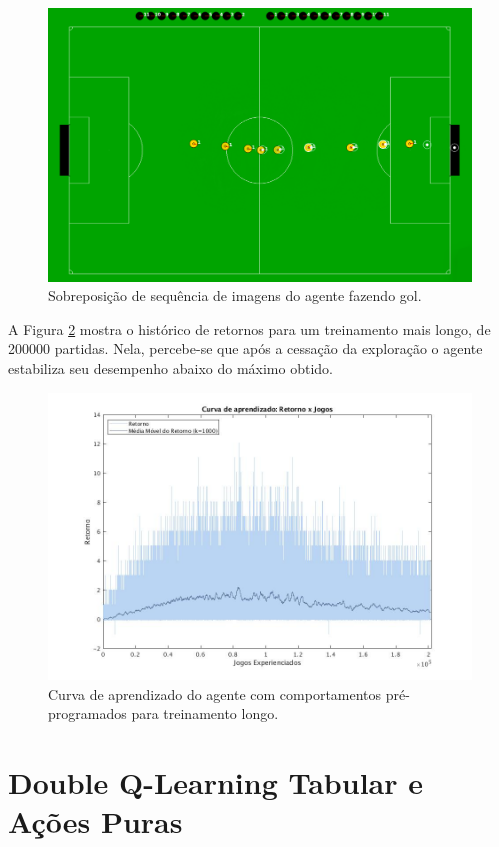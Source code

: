 \begin{figure}[H]
	\includegraphics[width=0.9\linewidth]{figs/goal-sequence.png}
	\centering
	\caption{Sobreposição de sequência de imagens do agente fazendo gol.}
	\label{fig:goal-seq}
\end{figure}

A Figura \ref{fig:curvalonga-bhv} mostra o histórico de retornos para um treinamento mais longo, de 200000 partidas. Nela, percebe-se que após a cessação da exploração o agente estabiliza seu desempenho abaixo do máximo obtido.

\begin{figure}[H]
	\includegraphics[width=0.9\linewidth]{figs/curvalonga-behaviors-tabular.jpg}
	\centering
	\caption{Curva de aprendizado do agente com comportamentos pré-programados para treinamento longo.}
	\label{fig:curvalonga-bhv}
\end{figure}

\section{Double Q-Learning Tabular e Ações Puras}

